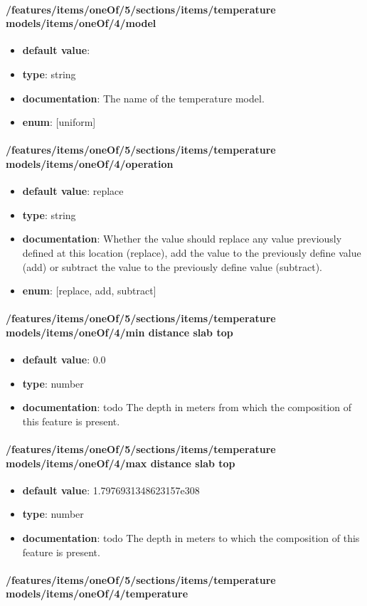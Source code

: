 \paragraph{/features/items/oneOf/5/sections/items/temperature models/items/oneOf/4/model}
\begin{itemize}\item {\bf default value}: 
\item {\bf type}: string
\item {\bf documentation}: The name of the temperature model.
\item {\bf enum}: [uniform]\end{itemize}\paragraph{/features/items/oneOf/5/sections/items/temperature models/items/oneOf/4/operation}
\begin{itemize}\item {\bf default value}: replace
\item {\bf type}: string
\item {\bf documentation}: Whether the value should replace any value previously defined at this location (replace), add the value to the previously define value (add) or subtract the value to the previously define value (subtract).
\item {\bf enum}: [replace, add, subtract]\end{itemize}\paragraph{/features/items/oneOf/5/sections/items/temperature models/items/oneOf/4/min distance slab top}
\begin{itemize}\item {\bf default value}: 0.0
\item {\bf type}: number
\item {\bf documentation}: todo The depth in meters from which the composition of this feature is present.
\end{itemize}\paragraph{/features/items/oneOf/5/sections/items/temperature models/items/oneOf/4/max distance slab top}
\begin{itemize}\item {\bf default value}: 1.7976931348623157e308
\item {\bf type}: number
\item {\bf documentation}: todo The depth in meters to which the composition of this feature is present.
\end{itemize}\paragraph{/features/items/oneOf/5/sections/items/temperature models/items/oneOf/4/temperature}

